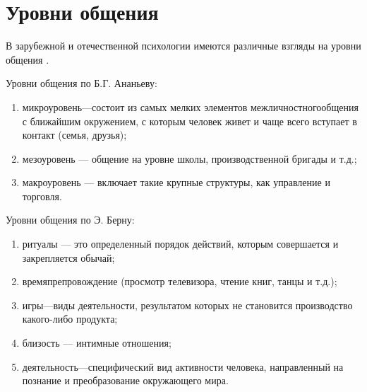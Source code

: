 \section{Уровни общения}
В зарубежной и отечественной психологии имеются различные взгляды на уровни общения \cite{28}. 

Уровни общения по Б.Г. Ананьеву:
\begin{enumerate}
	\item микроуровень—состоит из самых мелких элементов межличностногообщения с ближайшим окружением, с которым человек живет и чаще всего вступает в контакт (семья, друзья);
	\item мезоуровень — общение на уровне школы, производственной бригады и т.д.;
	\item макроуровень — включает такие крупные структуры, как управление и торговля. 
\end{enumerate}

Уровни общения по Э. Берну:
\begin{enumerate}
	\item ритуалы — это определенный порядок действий, которым совершается и закрепляется обычай;
	\item времяпрепровождение (просмотр телевизора, чтение книг, танцы и т.д.);
	\item игры—виды деятельности, результатом которых не становится производство какого-либо продукта;
	\item близость — интимные отношения;
	\item деятельность—специфический вид активности человека, направленный на познание и преобразование окружающего мира. 
\end{enumerate}

